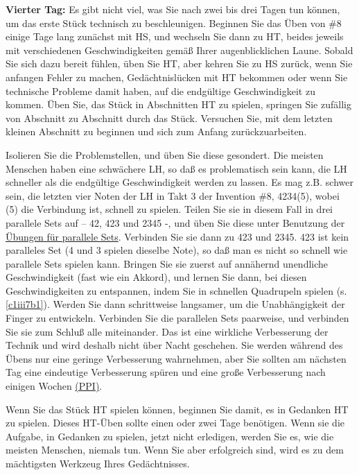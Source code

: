 \textbf{Vierter Tag:} Es gibt nicht viel, was Sie nach zwei bis drei Tagen tun können, um das erste Stück technisch zu beschleunigen.
Beginnen Sie das Üben von \#8 einige Tage lang zunächst mit HS, und wechseln Sie dann zu HT, beides jeweils mit verschiedenen Geschwindigkeiten gemäß Ihrer augenblicklichen Laune.
Sobald Sie sich dazu bereit fühlen, üben Sie HT, aber kehren Sie zu HS zurück, wenn Sie anfangen Fehler zu machen, Gedächtnislücken mit HT bekommen oder wenn Sie technische Probleme damit haben, auf die endgültige Geschwindigkeit zu kommen.
Üben Sie, das Stück in Abschnitten HT zu spielen, springen Sie zufällig von Abschnitt zu Abschnitt durch das Stück.
Versuchen Sie, mit dem letzten kleinen Abschnitt zu beginnen und sich zum Anfang zurückzuarbeiten.

Isolieren Sie die Problemstellen, und üben Sie diese gesondert.
Die meisten Menschen haben eine schwächere LH, so daß es problematisch sein kann, die LH schneller als die endgültige Geschwindigkeit werden zu lassen.
Es mag z.B. schwer sein, die letzten vier Noten der LH in Takt 3 der Invention \#8, 4234(5), wobei (5) die Verbindung ist, schnell zu spielen.
Teilen Sie sie in diesem Fall in drei parallele Sets auf -- 42, 423 und 2345 -, und üben Sie diese unter Benutzung der \hyperref[c1iii7b]{Übungen für parallele Sets}.
Verbinden Sie sie dann zu 423 und 2345.
423 ist kein paralleles Set (4 und 3 spielen dieselbe Note), so daß man es nicht so schnell wie parallele Sets spielen kann.
Bringen Sie sie zuerst auf annähernd unendliche Geschwindigkeit (fast wie ein Akkord), und lernen Sie dann, bei diesen Geschwindigkeiten zu entspannen, indem Sie in schnellen Quadrupeln spielen (s. \hyperref[c1iii7b1]{\autoref{c1iii7b1}}).
Werden Sie dann schrittweise langsamer, um die Unabhängigkeit der Finger zu entwickeln.
Verbinden Sie die parallelen Sets paarweise, und verbinden Sie sie zum Schluß alle miteinander.
Das ist eine wirkliche Verbesserung der Technik und wird deshalb nicht über Nacht geschehen.
Sie werden während des Übens nur eine geringe Verbesserung wahrnehmen, aber Sie sollten am nächsten Tag eine eindeutige Verbesserung spüren und eine große Verbesserung nach einigen Wochen \hyperref[c1ii15]{(PPI)}.

Wenn Sie das Stück HT spielen können, beginnen Sie damit, es in Gedanken HT zu spielen.
Dieses HT-Üben sollte einen oder zwei Tage benötigen.
Wenn sie die Aufgabe, in Gedanken zu spielen, jetzt nicht erledigen, werden Sie es, wie die meisten Menschen, niemals tun.
Wenn Sie aber erfolgreich sind, wird es zu dem mächtigsten Werkzeug Ihres Gedächtnisses.

